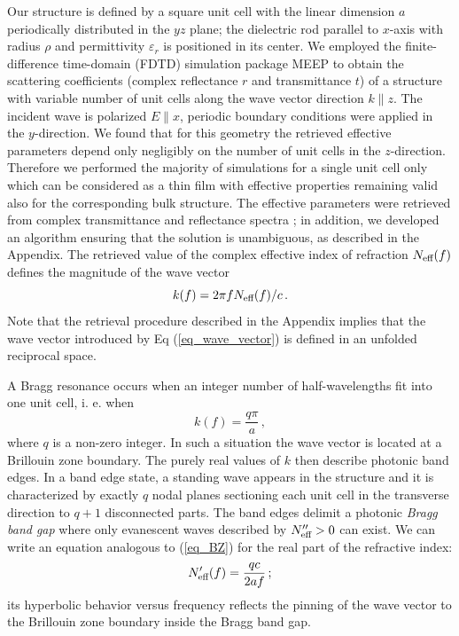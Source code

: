 \documentclass[letterpaper,12pt]{report}
\begin{document}
Our structure is defined by a square unit cell with the linear dimension $a$ periodically
distributed in the $yz$ plane; the dielectric rod parallel to $x$-axis with radius $\rho$
and permittivity $\varepsilon_r$ is positioned in its center. We employed the
finite-difference time-domain (FDTD) simulation package MEEP \cite{oskooi2010meep} to
obtain the scattering coefficients (complex reflectance $r$ and transmittance $t$) of a
structure with variable number of unit cells along the wave vector direction $k\parallel
z$. The incident wave is polarized $E\parallel x$, periodic boundary conditions were
applied in the $y$-direction. We found that for this geometry the retrieved effective
parameters depend only negligibly on the number of unit cells in the $z$-direction.
Therefore we performed the majority of simulations for a single unit cell only which can
be considered as a thin film with effective properties remaining valid also for the
corresponding bulk structure. The effective parameters were retrieved from complex
transmittance and reflectance spectra \cite{smith2002determination}; in addition, we
developed an algorithm ensuring that the solution is unambiguous, as described in the Appendix.
The retrieved value of the complex effective index of refraction $N_{\text{eff} }(f)$ defines the
magnitude of the wave vector
\begin{equation}\label{eq_wave_vector}
k(f) = 2\pi f N_{\text{eff} }(f) /c\,.
\end{equation}
Note that the retrieval procedure described in the Appendix implies that the wave vector
introduced by Eq (\ref{eq_wave_vector}) is defined in an unfolded reciprocal space. 

A Bragg resonance occurs when an integer number of half-wavelengths fit into one unit cell, i. e.  when
\begin{equation}\label{eq_BZ}
k(f) = \frac{q \pi}{a}\,,
\end{equation}
where $q$ is a non-zero integer. In such a situation the wave vector is located at a
Brillouin zone boundary. The purely real values of $k$ then describe photonic band edges.
In a band edge state, a standing wave appears in the structure and it is characterized by
exactly $q$ nodal planes sectioning each unit cell in the transverse direction to $q+1$
disconnected parts. The band edges delimit a photonic {\itshape Bragg band gap} where
only evanescent waves described by $N_{\text{eff} }''>0$ can exist.
We can write an equation analogous to (\ref{eq_BZ}) for the real part of the refractive
index:
\begin{equation}\label{eq_BZN}
N_{\text{eff} }'(f) = \frac{q c}{2 a f}\,;
\end{equation}
its hyperbolic behavior versus frequency reflects the pinning of the wave vector to the
Brillouin zone boundary inside the Bragg band gap.
\end{document}

